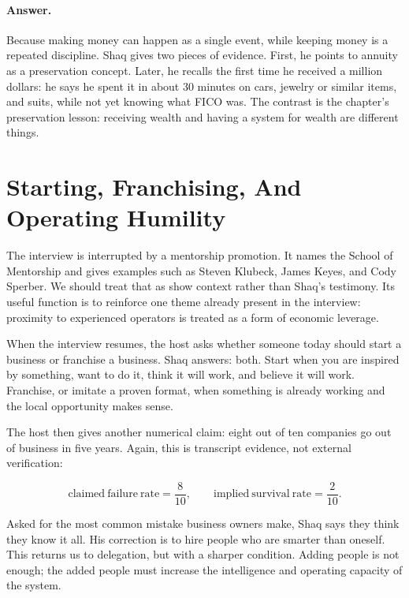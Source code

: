 \paragraph{Answer.}
Because making money can happen as a single event, while keeping money is a repeated discipline. Shaq gives two pieces of evidence. First, he points to annuity as a preservation concept. Later, he recalls the first time he received a million dollars: he says he spent it in about 30 minutes on cars, jewelry or similar items, and suits, while not yet knowing what FICO was. The contrast is the chapter's preservation lesson: receiving wealth and having a system for wealth are different things.

\section{Starting, Franchising, And Operating Humility}

The interview is interrupted by a mentorship promotion. It names the School of Mentorship and gives examples such as Steven Klubeck, James Keyes, and Cody Sperber. We should treat that as show context rather than Shaq's testimony. Its useful function is to reinforce one theme already present in the interview: proximity to experienced operators is treated as a form of economic leverage.

When the interview resumes, the host asks whether someone today should start a business or franchise a business. Shaq answers: both. Start when you are inspired by something, want to do it, think it will work, and believe it will work. Franchise, or imitate a proven format, when something is already working and the local opportunity makes sense.

The host then gives another numerical claim: eight out of ten companies go out of business in five years. Again, this is transcript evidence, not external verification:

\begin{equation}
\mathrm{claimed\ failure\ rate}
=
\frac{8}{10},
\qquad
\mathrm{implied\ survival\ rate}
=
\frac{2}{10}.
\end{equation}

Asked for the most common mistake business owners make, Shaq says they think they know it all. His correction is to hire people who are smarter than oneself. This returns us to delegation, but with a sharper condition. Adding people is not enough; the added people must increase the intelligence and operating capacity of the system.

